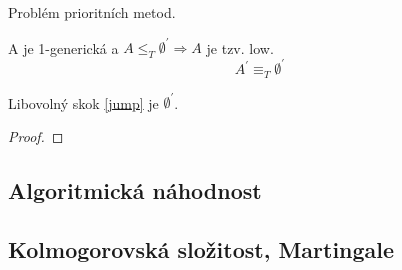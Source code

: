 \begin{note}
	Problém prioritních metod.
\end{note}

\begin{theorem}[Low]
	A je 1-generická a $A \leq_T \emptyset^{\prime} \Rightarrow A$ je tzv. low.
	\[ A^{\prime} \equiv_T \emptyset^{\prime} \]

	Libovolný skok \cref{jump} je $\emptyset^{\prime}$.
\end{theorem}
\begin{proof}
\end{proof}

\subsection{Algoritmická náhodnost}

\subsection{Kolmogorovská složitost, Martingale}
